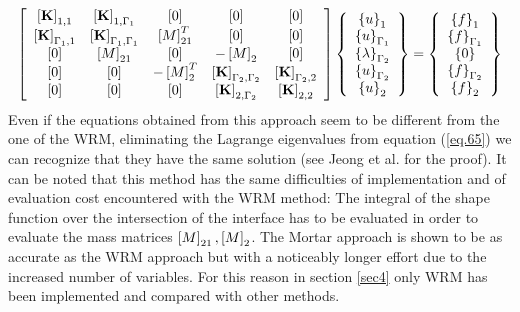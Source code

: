 \begin{equation}
\label{eq.65}
 \left[ \begin{array}{ccccc} 
    \left[{\mathbf{K}}\right]_{1,1} & \left[{\mathbf{K}}\right]_{1,\Gamma_1} &\left[{0}\right] &\left[{0}\right]& \left[{0}\right] \\
   \left[{\mathbf{K}}\right]_{\Gamma_1,1} & \left[{\mathbf{K}}\right]_{\Gamma_1,\Gamma_1} &\left[{M}\right]_{21}^T & \left[{0}\right]& \left[{0}\right]\\ \left[{0}\right] &\left[{M}\right]_{21} &\left[{0}\right] &-\left[{M}\right]_{2}& \left[{0}\right]\\\left[{0}\right]& \left[{0}\right]& -\left[{M}\right]_{2}^T & \left[{\mathbf{K}}\right]_{\Gamma_2,\Gamma_2} &\left[{\mathbf{K}}\right]_{\Gamma_2,2}\\   
    \left[{0}\right] & \left[{0}\right]&\left[{0}\right]& \left[{\mathbf{K}}\right]_{2,\Gamma_2} & \left[{\mathbf{K}}\right]_{2,2}\end{array} \right]\left\lbrace\begin{array}{c} \left\lbrace{u}\right \rbrace_1\\\left\lbrace{u}\right \rbrace_{\Gamma_1}\\\left\lbrace{\lambda}\right \rbrace_{\Gamma_2}\\\left\lbrace{u}\right \rbrace_{\Gamma_2}\\\left\lbrace{u}\right \rbrace_2
    \end{array}\right\rbrace=\left\lbrace\begin{array}{c} \left\lbrace{f}\right \rbrace_1\\\left\lbrace{f}\right \rbrace_{\Gamma_1}\\\left\lbrace{0}\right \rbrace\\\left\lbrace{f}\right \rbrace_{\Gamma_2}\\\left\lbrace{f}\right \rbrace_2
    \end{array}\right\rbrace
\end{equation}
Even if the equations obtained from this approach seem to be different from the one of the WRM, eliminating the Lagrange eigenvalues from equation (\ref{eq.65}) we can recognize that they have the same solution (see Jeong et al. \cite{jeong2017element} for the proof). It can be noted that this method has the same difficulties of implementation and of evaluation cost encountered with the WRM method: The integral of the shape function over the intersection of the interface has to be evaluated in order to evaluate the mass matrices $\left[{M}\right]_{21},\left[{M}\right]_{2}$. The Mortar approach is shown to be as accurate as the WRM approach but with a noticeably longer effort due to the increased number of variables. For this reason in section \ref{sec4} only WRM has been implemented and compared with other methods.
